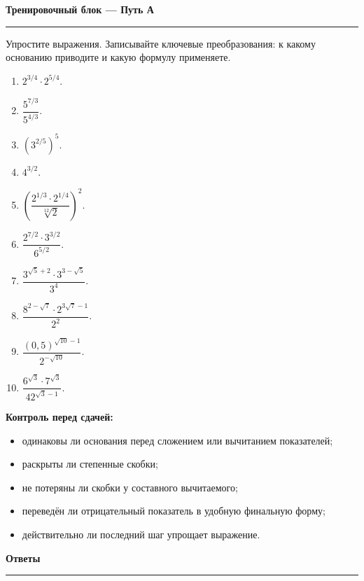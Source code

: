 \documentclass[a4paper,12pt]{article}
\newcommand{\sectionline}[1]{%
  \vspace{0.65em}%
  {\large\bfseries\color{darkaccent}#1}\par
  \vspace{0.18em}\color{rulegray}\hrule\color{textgray}\vspace{0.45em}%
}
\begin{document}
\clearpage

\sectionline{Тренировочный блок — Путь А}

Упростите выражения. Записывайте ключевые преобразования: к какому основанию приводите и какую формулу применяете.

\begin{enumerate}
  \item $2^{3/4}\cdot2^{5/4}$.
  \item $\dfrac{5^{7/3}}{5^{4/3}}$.
  \item $\left(3^{2/5}\right)^5$.
  \item $4^{3/2}$.
  \item $\left(\dfrac{2^{1/3}\cdot2^{1/4}}{\sqrt[12]{2}}\right)^2$.
  \item $\dfrac{2^{7/2}\cdot3^{3/2}}{6^{5/2}}$.
  \item $\dfrac{3^{\sqrt5+2}\cdot3^{3-\sqrt5}}{3^4}$.
  \item $\dfrac{8^{2-\sqrt7}\cdot2^{3\sqrt7-1}}{2^2}$.
  \item $\dfrac{(0{,}5)^{\sqrt{10}-1}}{2^{-\sqrt{10}}}$.
  \item $\dfrac{6^{\sqrt3}\cdot7^{\sqrt3}}{42^{\sqrt3-1}}$.
\end{enumerate}

\vfill
\textbf{Контроль перед сдачей:}
\begin{itemize}
  \item одинаковы ли основания перед сложением или вычитанием показателей;
  \item раскрыты ли степенные скобки;
  \item не потеряны ли скобки у составного вычитаемого;
  \item переведён ли отрицательный показатель в удобную финальную форму;
  \item действительно ли последний шаг упрощает выражение.
\end{itemize}

\clearpage

\sectionline{Ответы}
\end{document}
